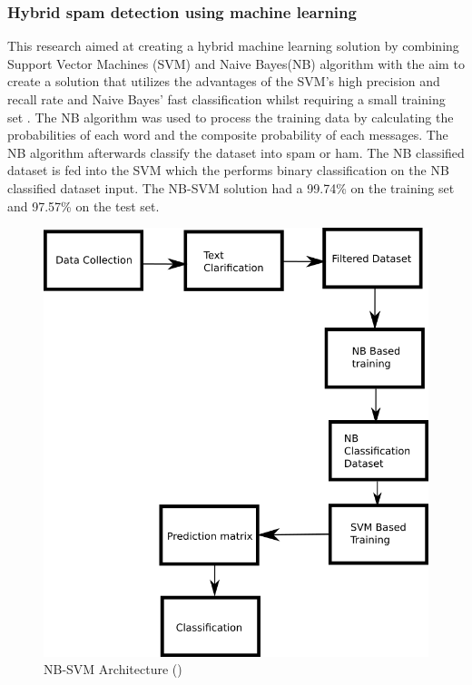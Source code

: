 \subsubsection{Hybrid spam detection using machine learning}
This research aimed at creating a hybrid machine learning solution by combining Support Vector Machines (SVM) and Naive Bayes(NB) algorithm with the aim to create a solution that utilizes the advantages of the SVM's high precision and recall rate and Naive Bayes' fast classification whilst requiring a small training set \cite{hybrid_2018}. The NB algorithm was used to process the training data by calculating the probabilities of each word and the composite probability of each messages. The NB algorithm afterwards classify the dataset into spam or ham. The NB classified dataset is fed into the SVM which the performs binary classification on the NB classified dataset input. The NB-SVM solution had a 99.74\% on the training set and 97.57\% on the test set.

\begin{figure}[H]
    \centering
    \includegraphics[width=13cm]{img/hybrid.png}
    \caption{NB-SVM Architecture (\cite{hybrid_2018})}
    \label{fig:hybrid_img}
\end{figure}
